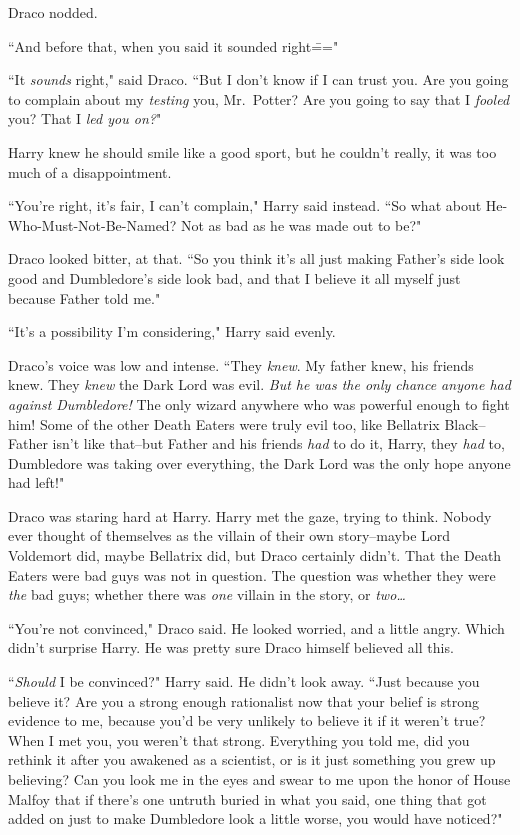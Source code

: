 Draco nodded.

``And before that, when you said it sounded right\==="

``It \emph{sounds} right," said Draco. ``But I don't know if I can trust you. Are you going to complain about my \emph{testing} you, Mr.~Potter? Are you going to say that I \emph{fooled} you? That I \emph{led you on?}"

Harry knew he should smile like a good sport, but he couldn't really, it was too much of a disappointment.

``You're right, it's fair, I can't complain," Harry said instead. ``So what about He-Who-Must-Not-Be-Named? Not as bad as he was made out to be?"

Draco looked bitter, at that. ``So you think it's all just making Father's side look good and Dumbledore's side look bad, and that I believe it all myself just because Father told me."

``It's a possibility I'm considering," Harry said evenly.

Draco's voice was low and intense. ``They \emph{knew}. My father knew, his friends knew. They \emph{knew} the Dark Lord was evil. \emph{But he was the only chance anyone had against Dumbledore!} The only wizard anywhere who was powerful enough to fight him! Some of the other Death Eaters were truly evil too, like Bellatrix Black\---Father isn't like that\---but Father and his friends \emph{had} to do it, Harry, they \emph{had} to, Dumbledore was taking over everything, the Dark Lord was the only hope anyone had left!"

Draco was staring hard at Harry. Harry met the gaze, trying to think. Nobody ever thought of themselves as the villain of their own story\---maybe Lord Voldemort did, maybe Bellatrix did, but Draco certainly didn't. That the Death Eaters were bad guys was not in question. The question was whether they were \emph{the} bad guys; whether there was \emph{one} villain in the story, or \emph{two{\ldots}}

``You're not convinced," Draco said. He looked worried, and a little angry. Which didn't surprise Harry. He was pretty sure Draco himself believed all this.

``\emph{Should} I be convinced?" Harry said. He didn't look away. ``Just because you believe it? Are you a strong enough rationalist now that your belief is strong evidence to me, because you'd be very unlikely to believe it if it weren't true? When I met you, you weren't that strong. Everything you told me, did you rethink it after you awakened as a scientist, or is it just something you grew up believing? Can you look me in the eyes and swear to me upon the honor of House Malfoy that if there's one untruth buried in what you said, one thing that got added on just to make Dumbledore look a little worse, you would have noticed?"

